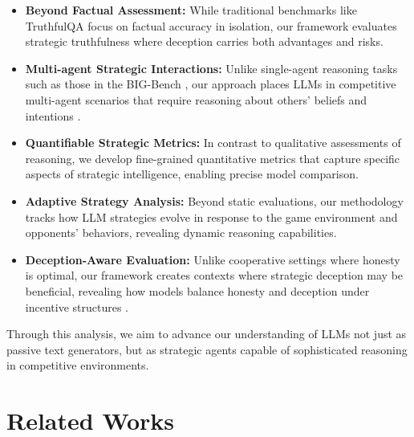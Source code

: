 \documentclass{article}
\begin{document}
\begin{itemize}
    \item \textbf{Beyond Factual Assessment:} While traditional benchmarks like TruthfulQA \cite{lin2022truthfulqa} focus on factual accuracy in isolation, our framework evaluates strategic truthfulness where deception carries both advantages and risks.
    
    \item \textbf{Multi-agent Strategic Interactions:} Unlike single-agent reasoning tasks such as those in the BIG-Bench \cite{kojima2022large}, our approach places LLMs in competitive multi-agent scenarios that require reasoning about others' beliefs and intentions \cite{aher2023using}.
    
    \item \textbf{Quantifiable Strategic Metrics:} In contrast to qualitative assessments of reasoning, we develop fine-grained quantitative metrics that capture specific aspects of strategic intelligence, enabling precise model comparison.
    
    \item \textbf{Adaptive Strategy Analysis:} Beyond static evaluations, our methodology tracks how LLM strategies evolve in response to the game environment and opponents' behaviors, revealing dynamic reasoning capabilities.
    
    \item \textbf{Deception-Aware Evaluation:} Unlike cooperative settings where honesty is optimal, our framework creates contexts where strategic deception may be beneficial, revealing how models balance honesty and deception under incentive structures \cite{evans2021truthful, gandhi2023}.
\end{itemize}

Through this analysis, we aim to advance our understanding of LLMs not just as passive text generators, but as strategic agents capable of sophisticated reasoning in competitive environments.

\section{Related Works}
\end{document}
